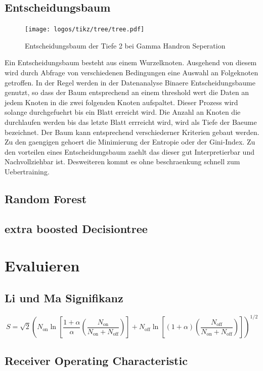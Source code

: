 \subsection{Entscheidungsbaum}
\begin{figure}
  \texttt{[image: logos/tikz/tree/tree.pdf]}
  \caption{Entscheidungsbaum der Tiefe 2 bei Gamma Handron Seperation}
\end{figure}
Ein Entscheidungsbaum besteht aus einem Wurzelknoten. Ausgehend von diesem wird durch Abfrage von verschiedenen Bedingungen eine Auswahl an Folgeknoten getroffen. In der Regel werden in der Datenanalyse Binaere Entscheidungsbaume genutzt, so dass der Baum entsprechend an einem threshold wert die Daten an jedem Knoten in die zwei folgenden Knoten aufspaltet. Dieser Prozess wird solange durchgefuehrt bis ein Blatt erreicht wird. Die Anzahl an Knoten die durchlaufen werden bis das letzte Blatt errreicht wird, wird als Tiefe der Baeume bezeichnet.
Der Baum kann entsprechend verschiederner Kriterien gebaut werden. Zu den gaengigen gehoert die Minimierung der Entropie oder der Gini-Index. 
Zu den vorteilen eines Entscheidungsbaum zaehlt das dieser gut Interpretierbar und Nachvollziehbar ist. Desweiteren kommt es ohne beschraenkung schnell zum Uebertraining.
\subsection{Random Forest}
\subsection{extra boosted Decisiontree}

\section{Evaluieren}

\subsection{Li und Ma Signifikanz}

\begin{equation}
S = \sqrt{2} \left( N_\text{on} \ln \left[ \frac{1+ \alpha}{\alpha}\left( \frac{N_\text{on}}{N_\text{on} + N_\text{off}} \right) \right] + N_\text{off} \ln \left[ \left( 1+ \alpha \right) \left( \frac{N_\text{off}}{N_\text{on} + N_\text{off}} \right) \right] \right)^{1/2}
\end{equation}
\subsection{Receiver Operating Characteristic}

